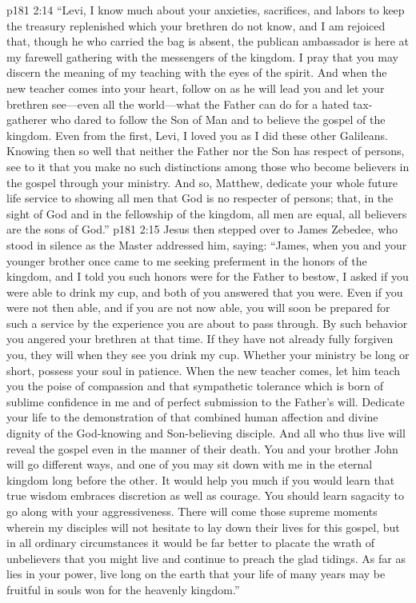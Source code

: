 \vs p181 2:14 \textcolor{ubdarkred}{“Levi, I know much about your anxieties, sacrifices, and labors to keep the treasury replenished which your brethren do not know, and I am rejoiced that, though he who carried the bag is absent, the publican ambassador is here at my farewell gathering with the messengers of the kingdom. I pray that you may discern the meaning of my teaching with the eyes of the spirit. And when the new teacher comes into your heart, follow on as he will lead you and let your brethren see---even all the world---what the Father can do for a hated tax\hyp{}gatherer who dared to follow the Son of Man and to believe the gospel of the kingdom. Even from the first, Levi, I loved you as I did these other Galileans. Knowing then so well that neither the Father nor the Son has respect of persons, see to it that you make no such distinctions among those who become believers in the gospel through your ministry. And so, Matthew, dedicate your whole future life service to showing all men that God is no respecter of persons; that, in the sight of God and in the fellowship of the kingdom, all men are equal, all believers are the sons of God.”}
\pc \vs p181 2:15 Jesus then stepped over to James Zebedee, who stood in silence as the Master addressed him, saying: \textcolor{ubdarkred}{“James, when you and your younger brother once came to me seeking preferment in the honors of the kingdom, and I told you such honors were for the Father to bestow, I asked if you were able to drink my cup, and both of you answered that you were. Even if you were not then able, and if you are not now able, you will soon be prepared for such a service by the experience you are about to pass through. By such behavior you angered your brethren at that time. If they have not already fully forgiven you, they will when they see you drink my cup. Whether your ministry be long or short, possess your soul in patience. When the new teacher comes, let him teach you the poise of compassion and that sympathetic tolerance which is born of sublime confidence in me and of perfect submission to the Father’s will. Dedicate your life to the demonstration of that combined human affection and divine dignity of the God\hyp{}knowing and Son\hyp{}believing disciple. And all who thus live will reveal the gospel even in the manner of their death. You and your brother John will go different ways, and one of you may sit down with me in the eternal kingdom long before the other. It would help you much if you would learn that true wisdom embraces discretion as well as courage. You should learn sagacity to go along with your aggressiveness. There will come those supreme moments wherein my disciples will not hesitate to lay down their lives for this gospel, but in all ordinary circumstances it would be far better to placate the wrath of unbelievers that you might live and continue to preach the glad tidings. As far as lies in your power, live long on the earth that your life of many years may be fruitful in souls won for the heavenly kingdom.”}
